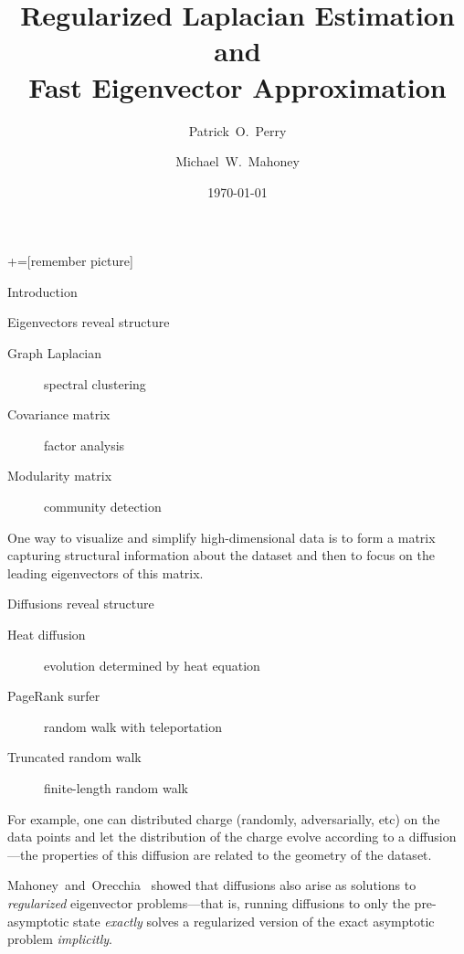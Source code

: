 \documentclass[xcolor=dvipsnames]{beamer}
\title{Regularized Laplacian Estimation and \\ Fast Eigenvector Approximation}
\author{Patrick~O.~Perry \and Michael~W.~Mahoney}
\institute[NYU Stern and Stanford] {
  NYU Stern \and Stanford University
}
\date{\today}
\begin{document}
+=[remember picture]

\everymath{\displaystyle}

\begin{frame}
  \titlepage
\end{frame}


\begin{frame}[c]
  \begin{block}{}
  \begin{center}
    \huge{Introduction}
  \end{center}
  \end{block}
\end{frame}


\begin{frame}
  \begin{block}{Eigenvectors reveal structure}
  \begin{description}
    \item[Graph Laplacian] spectral clustering
    \item[Covariance matrix] factor analysis
    \item[Modularity matrix] community detection
  \end{description}
  \end{block}
  
  One way to visualize and simplify high-dimensional data is to form a matrix
  capturing structural information about the dataset and then to focus on
  the leading eigenvectors of this matrix.
\end{frame}


\begin{frame}
  \begin{block}{Diffusions reveal structure}
  \begin{description}
    \item[Heat diffusion] evolution determined by heat equation
    \item[PageRank surfer] random walk with teleportation
    \item[Truncated random walk] finite-length random walk
  \end{description}
  \end{block}

  For example, one can distributed charge (randomly, adversarially, etc) on 
  the data points and let the distribution of the charge evolve according to 
  a diffusion---the properties of this diffusion are related to the geometry 
  of the dataset.

  Mahoney~and~Orecchia~\cite{MO11-implementing} showed that diffusions also 
  arise as solutions to \emph{regularized} eigenvector problems---that is, 
  running diffusions to only the pre-asymptotic state \emph{exactly} solves 
  a regularized version of the exact asymptotic problem \emph{implicitly}.
\end{frame}
\end{document}
